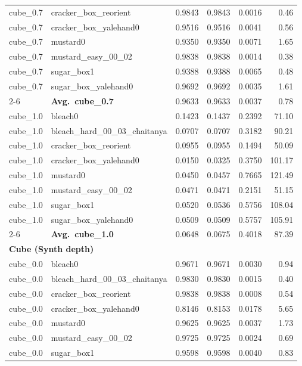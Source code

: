 \begin{longtable}{llrrrr}
  cube_0.7 & cracker\_box\_reorient & 0.9843 & 0.9843 & 0.0016 & 0.46 \\
  cube_0.7 & cracker\_box\_yalehand0 & 0.9516 & 0.9516 & 0.0041 & 0.56 \\
  cube_0.7 & mustard0 & 0.9350 & 0.9350 & 0.0071 & 1.65 \\
  cube_0.7 & mustard\_easy\_00\_02 & 0.9838 & 0.9838 & 0.0014 & 0.38 \\
  cube_0.7 & sugar\_box1 & 0.9388 & 0.9388 & 0.0065 & 0.48 \\
  cube_0.7 & sugar\_box\_yalehand0 & 0.9692 & 0.9692 & 0.0035 & 1.61 \\
  \cmidrule{2-6}
  & \textbf{Avg.~cube_0.7} & 0.9633 & 0.9633 & 0.0037 & 0.78 \\
  \midrule
  cube_1.0 & bleach0 & 0.1423 & 0.1437 & 0.2392 & 71.10 \\
  cube_1.0 & bleach\_hard\_00\_03\_chaitanya & 0.0707 & 0.0707 & 0.3182 & 90.21 \\
  cube_1.0 & cracker\_box\_reorient & 0.0955 & 0.0955 & 0.1494 & 50.09 \\
  cube_1.0 & cracker\_box\_yalehand0 & 0.0150 & 0.0325 & 0.3750 & 101.17 \\
  cube_1.0 & mustard0 & 0.0450 & 0.0457 & 0.7665 & 121.49 \\
  cube_1.0 & mustard\_easy\_00\_02 & 0.0471 & 0.0471 & 0.2151 & 51.15 \\
  cube_1.0 & sugar\_box1 & 0.0520 & 0.0536 & 0.5756 & 108.04 \\
  cube_1.0 & sugar\_box\_yalehand0 & 0.0509 & 0.0509 & 0.5757 & 105.91 \\
  \cmidrule{2-6}
  & \textbf{Avg.~cube_1.0} & 0.0648 & 0.0675 & 0.4018 & 87.39 \\
  \midrule
\multicolumn{6}{l}{\textbf{Cube (Synth depth)}} \\
\midrule
  cube_0.0 & bleach0 & 0.9671 & 0.9671 & 0.0030 & 0.94 \\
  cube_0.0 & bleach\_hard\_00\_03\_chaitanya & 0.9830 & 0.9830 & 0.0015 & 0.40 \\
  cube_0.0 & cracker\_box\_reorient & 0.9838 & 0.9838 & 0.0008 & 0.54 \\
  cube_0.0 & cracker\_box\_yalehand0 & 0.8146 & 0.8153 & 0.0178 & 5.65 \\
  cube_0.0 & mustard0 & 0.9625 & 0.9625 & 0.0037 & 1.73 \\
  cube_0.0 & mustard\_easy\_00\_02 & 0.9725 & 0.9725 & 0.0024 & 0.69 \\
  cube_0.0 & sugar\_box1 & 0.9598 & 0.9598 & 0.0040 & 0.83 \\

\end{longtable}
